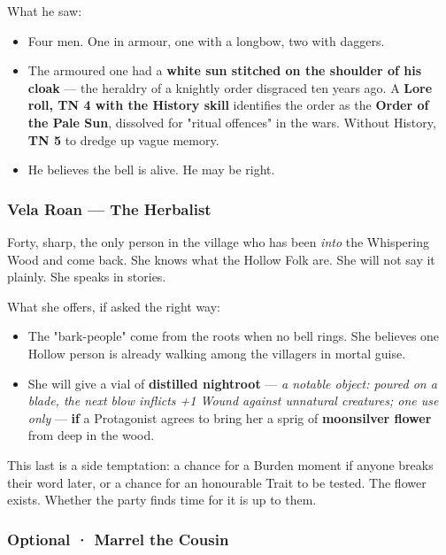 \documentclass[10pt,a4paper]{article}
\newcommand{\tightlist}{\setlength{\itemsep}{0pt}\setlength{\parskip}{0pt}}
\begin{document}
What he saw:

\begin{itemize}
\tightlist
\item
  Four men. One in armour, one with a longbow, two with daggers.
\item
  The armoured one had a \textbf{white sun stitched on the shoulder of his cloak} --- the heraldry of a knightly order disgraced ten years ago. A \textbf{Lore roll, TN 4 with the History skill} identifies the order as the \textbf{Order of the Pale Sun}, dissolved for "ritual offences" in the wars. Without History, \textbf{TN 5} to dredge up vague memory.
\item
  He believes the bell is alive. He may be right.
\end{itemize}

\subsubsection{Vela Roan --- The Herbalist}\label{vela-roan--the-herbalist}

Forty, sharp, the only person in the village who has been \emph{into} the Whispering Wood and come back. She knows what the Hollow Folk are. She will not say it plainly. She speaks in stories.

What she offers, if asked the right way:

\begin{itemize}
\tightlist
\item
  The "bark-people" come from the roots when no bell rings. She believes one Hollow person is already walking among the villagers in mortal guise.
\item
  She will give a vial of \textbf{distilled nightroot} --- \emph{a notable object: poured on a blade, the next blow inflicts +1 Wound against unnatural creatures; one use only} --- \textbf{if} a Protagonist agrees to bring her a sprig of \textbf{moonsilver flower} from deep in the wood.
\end{itemize}

This last is a side temptation: a chance for a Burden moment if anyone breaks their word later, or a chance for an honourable Trait to be tested. The flower exists. Whether the party finds time for it is up to them.

\subsubsection{Optional · Marrel the Cousin}\label{optional--marrel-the-cousin}
\end{document}
